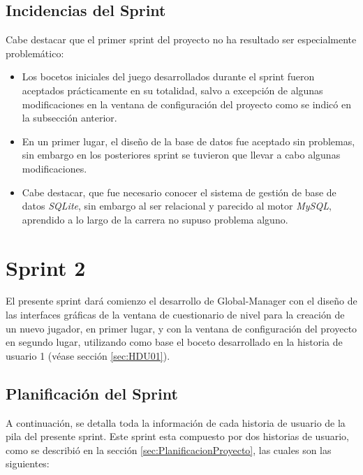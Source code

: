 \subsection{Incidencias del Sprint}
\label{sec:IncidenciasSprint1}

Cabe destacar que el primer sprint del proyecto no ha resultado ser especialmente problemático:
\begin{itemize}
	\item Los bocetos iniciales del juego desarrollados durante el sprint fueron aceptados prácticamente en su totalidad, salvo a excepción de algunas modificaciones en la ventana de configuración del proyecto como se indicó en la subsección anterior.
	\item En un primer lugar, el diseño de la base de datos fue aceptado sin problemas, sin embargo en los posteriores sprint se tuvieron que llevar a cabo algunas modificaciones.
	\item Cabe destacar, que fue necesario conocer el sistema de gestión de base de datos \emph{SQLite}, sin embargo al ser relacional y parecido al motor \emph{MySQL}, aprendido a lo largo de la carrera no supuso problema alguno.
\end{itemize}

\newpage

\section{Sprint 2}
\label{sec:Sprint2}

El presente sprint dará comienzo el desarrollo de Global-Manager con el diseño de las interfaces gráficas de la ventana de cuestionario de nivel para la creación de un nuevo jugador, en primer lugar, y con la ventana de configuración del proyecto en segundo lugar, utilizando como base el boceto desarrollado en la historia de usuario 1 (véase sección \ref{sec:HDU01}). 

\subsection{Planificación del Sprint}
\label{sec:PlanificacionSprint2}

A continuación, se detalla toda la información de cada historia de usuario de la pila del presente sprint. Este sprint esta compuesto por dos historias de usuario, como se describió en la sección \ref{sec:PlanificacionProyecto}, las cuales son las siguientes:

